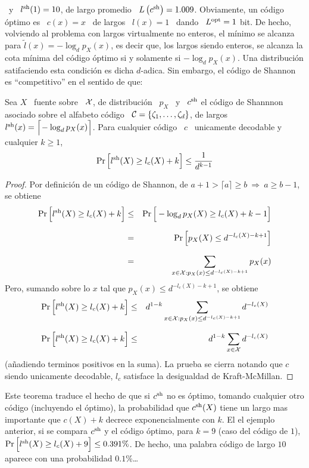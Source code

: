 \ y  \ $l^{\mathrm{sh}}(1) =  10$, de  largo promedio \  $L\left( c^{\mathrm{sh}} \right)  = 1.009$.
Obviamente, un  c\'odigo \'optimo es  \ $c(x) =  x$ \ de largos  \ $l(x) =  1$ \
dando  \  $L^{\mathrm{opt}}  =  1$  bit.   De hecho,  volviendo  al  problema  con  largos
virtualmente  no enteros,  el m\'inimo  se  alcanza para  $\widetilde{l}(x) =  -
\log_d p_X(x)$,  es decir  que, los  largos siendo enteros,  se alcanza  la cota
m\'inima  del  c\'odigo \'optimo  si  y solamente  si  $-  \log_d p_X(x)$.   Una
distribuci\'on satifaciendo  esta condici\'on es dicha  $d$-adica.  Sin embargo,
el c\'odigo de Shannon es ``competitivo'' en el sentido de que:
%
\begin{teorema}
  Sea $X$  \ fuente sobre  \ $\mathcal{X}$, de  distribuci\'on \ $p_X$  \ y \  $c^{\mathrm{sh}}$ el
  c\'odigo de Shannnon asociado sobre el  alfabeto c\'odigo \ $\mathcal{C} = \{ \zeta_1 ,
  \ldots  , \zeta_d \}$,  de largos  $l^{\mathrm{sh}}(x) =  \Big\lceil\!  -  \log_d p_X(x)
  \Big\rceil$.  Para cualquier c\'odigo \ $c$ \ unicamente decodable y cualquier
  $k \ge 1$,
  \[
  \Pr\Big[ l^{\mathrm{sh}}(X) \ge l_c(X) + k \Big] \le \frac{1}{d^{k-1}}
  \]
\end{teorema}
%
\begin{proof}
  Por definici\'on de un c\'odigo de Shannon, de  $a + 1 > \lceil a \rceil \ge b
  \: \Rightarrow \: a \ge b-1$, se obtiene
  \begin{eqnarray*}
    \Pr\Big[ l^{\mathrm{sh}}(X)  \ge l_c(X) + k  \Big] & \le & \Pr\Big[  - \log_d p_X(X)
    \ge  l_c(X) + k  - 1  \Big]\\[2.5mm]
    & = &  \Pr\Big[ p_X(X)  \le d^{-l_c(X)  - k  + 1} \Big]\\[2.5mm]
    & = &  \sum_{x \in \mathcal{X} : p_X(x) \le d^{-l_c(X)  - k  + 1}} p_X(x)
  \end{eqnarray*}
  Pero,  sumando sobre  lo $x$  tal que  $p_X(x) \le  d^{-l_c(X) -  k +  1}$, se
  obtiene
  \begin{eqnarray*}
  \Pr\Big[ l^{\mathrm{sh}}(X) \ge l_c(X) + k \Big] & \le & d^{1-k} \sum_{x \in \mathcal{X} :
  p_X(x) \le d^{-l_c(X) - k + 1}} d^{-l_c(X)}\\[2.5mm]
  \Pr\Big[ l^{\mathrm{sh}}(X) \ge l_c(X) + k \Big] & \le & d^{1-k} \sum_{x \in \mathcal{X}}
  d^{-l_c(X)}
  \end{eqnarray*}
  (a\~nadiendo terminos positivos  en la suma). La prueba  se cierra notando que
  $c$   siendo  unicamente   decodable,  $l_c$   satisface  la   desigualdad  de
  Kraft-McMillan.
\end{proof}
%
Este  teorema  traduce el  hecho  de  que si  $c^{\mathrm{sh}}$  no  es \'optimo,  tomando
cualquier otro c\'odigo (incluyendo el \'optimo), la probabilidad que $c^{\mathrm{sh}}(X)$
tiene un largo mas importante  que $c(X)+k$ decrece exponencialmente con $k$. El
el ejemplo anterior, si se compara $c^{\mathrm{sh}}$  y el c\'odigo \'optimo, para $k = 9$
(caso del  c\'odigo de  $1$), $\Pr\Big[  l^{\mathrm{sh}}(X) \ge l_c(X)  + 9  \Big] \le
0.391  \%$.  De hecho,  una  palabra  c\'odigo de  largo  $10$  aparece con  una
probabilidad $0.1\%$\ldots

